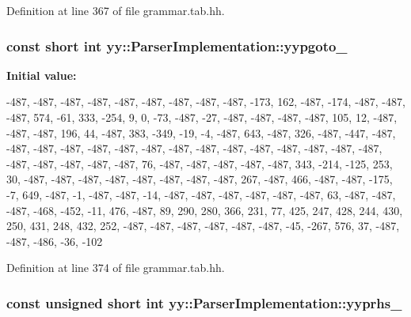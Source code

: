 Definition at line 367 of file grammar.tab.hh.

\hypertarget{classyy_1_1_parser_implementation_ae6db415be91281c742e283e751832b8b}{
\subsubsection[{yypgoto\_\-}]{\setlength{\rightskip}{0pt plus 5cm}const short int {\bf yy::ParserImplementation::yypgoto\_\-}}}
\label{classyy_1_1_parser_implementation_ae6db415be91281c742e283e751832b8b}
{\bfseries Initial value:}
\begin{DoxyCode}

  {
      -487,  -487,  -487,  -487,  -487,  -487,  -487,  -487,  -487,  -173,
     162,  -487,  -174,  -487,  -487,  -487,   574,   -61,   333,  -254,
       9,     0,   -73,  -487,   -27,  -487,  -487,  -487,  -487,   105,
      12,  -487,  -487,  -487,   196,    44,  -487,   383,  -349,   -19,
      -4,  -487,   643,  -487,   326,  -487,  -447,  -487,  -487,  -487,
    -487,  -487,  -487,  -487,  -487,  -487,  -487,  -487,  -487,  -487,
    -487,  -487,  -487,  -487,  -487,  -487,  -487,    76,  -487,  -487,
    -487,  -487,  -487,   343,  -214,  -125,   253,    30,  -487,  -487,
    -487,  -487,  -487,  -487,  -487,  -487,   267,  -487,   466,  -487,
    -487,  -175,    -7,   649,  -487,    -1,  -487,  -487,   -14,  -487,
    -487,  -487,  -487,  -487,  -487,    63,  -487,  -487,  -487,  -468,
    -452,   -11,   476,  -487,    89,   290,   280,   366,   231,    77,
     425,   247,   428,   244,   430,   250,   431,   248,   432,   252,
    -487,  -487,  -487,  -487,  -487,  -487,   -45,  -267,   576,    37,
    -487,  -487,  -486,   -36,  -102
  }
\end{DoxyCode}


Definition at line 374 of file grammar.tab.hh.

\hypertarget{classyy_1_1_parser_implementation_ae77c38fbf199fdd9cd84059607af0704}{
\subsubsection[{yyprhs\_\-}]{\setlength{\rightskip}{0pt plus 5cm}const unsigned short int {\bf yy::ParserImplementation::yyprhs\_\-}}}
\label{classyy_1_1_parser_implementation_ae77c38fbf199fdd9cd84059607af0704}


